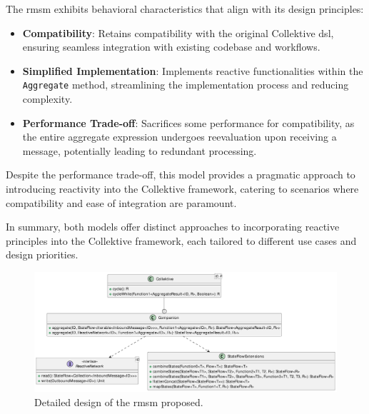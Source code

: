 The \ac{rmsm} exhibits behavioral characteristics that align with its design principles:

\begin{itemize}
    \item \textbf{Compatibility}: Retains compatibility with the original Collektive \ac{dsl}, ensuring seamless integration with existing codebase and workflows.
    \item \textbf{Simplified Implementation}: Implements reactive functionalities within the \texttt{Aggregate} method, streamlining the implementation process and reducing complexity.
    \item \textbf{Performance Trade-off}: Sacrifices some performance for compatibility, as the entire aggregate expression undergoes reevaluation upon receiving a message, potentially leading to redundant processing.
\end{itemize}

Despite the performance trade-off, this model provides a pragmatic approach to introducing reactivity into the Collektive framework, catering to scenarios where compatibility and ease of integration are paramount.

In summary, both models offer distinct approaches to incorporating reactive principles into the Collektive framework, each tailored to different use cases and design priorities.

\begin{figure}
    \centering
    \includegraphics[width=\linewidth]{figures/collektive-rmsm-design.pdf}
    \caption{Detailed design of the \ac{rmsm} proposed.}
    \label{fig:collektive-rmsm-design}
\end{figure}
